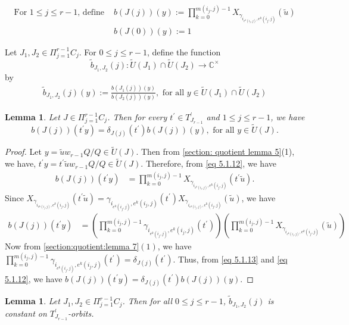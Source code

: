 \documentclass[12pt,reqno]{amsart}
\numberwithin{equation}{section}
\newtheorem{lemma}[theorem]{Lemma}
\theoremstyle{definition}
\begin{document}
	\begin{align}
		\text{For $1\leq j\leq r-1$, define\ }&
		b(J(j))(y):=\prod_{k=0}^{m(i_{j},j)-1}X_{\gamma_{i_{e^{k}(i_{j},j)},e^{k}(i_{j},j)}}(\tilde{u})\label{eq 5.1.12}\\
		&b(J(0))(y):=1\label{eq 5.1.14}
	\end{align}
	
	
	Let $J_{1},J_{2}\in\Pi_{j=1}^{r-1}C_{j}$. For $0\leq j\leq r-1$, define the function
	$$\tilde{b}_{J_{1},J_{2}}(j):\tilde{U}(J_{1})\cap \tilde{U}(J_{2})\longrightarrow\mathbb{C^{\times}}$$ by \begin{align}\label{eq 5.1.15}
		\tilde{b}_{J_{1},J_{2}}(j)(y):=\frac{b(J_{1}(j))(y)}{b(J_{2}(j))(y)},\text{\ for all
			$y\in \tilde{U}(J_{1})\cap \tilde{U}(J_{2})$}
	\end{align}
	\begin{lemma}\label{section:quotient:lemma 8}
		Let $J\in\Pi_{j=1}^{r-1}C_{j}$. Then for every $t^{\prime}\in T^{\prime}_{J_{r-1}}$ and $1\leq j\leq r-1$,  we have $$b(J(j))(t^{\prime}y)=\delta_{J(j)}(t^{\prime})b(J(j))(y),\text{\ for all $y\in \tilde{U}(J)$}.$$
	\end{lemma}
	\begin{proof}
		Let	$y=\tilde{u}w_{r-1}Q/Q\in\tilde{U}(J)$. Then from \cref{section: quotient lemma 5}(1), we have, $t^{\prime}y=t^{\prime}\tilde{u}w_{r-1}Q/Q\in \tilde{U}(J)$. Therefore, from \cref{eq 5.1.12}, we have 
		\begin{align*}
			b(J(j))(t^{\prime}y)&=\prod_{k=0}^{m(i_{j},j)-1}X_{\gamma_{i_{e^{k}(i_{j},j)},e^{k}(i_{j},j)}}(t^{\prime}\tilde{u}).
		\end{align*}
		Since $X_{\gamma_{i_{e^{k}(i_{j},j)},e^{k}(i_{j},j)}}(t^{\prime}\tilde{u})=\gamma_{i_{e^{k}(i_{j},j)},e^{k}(i_{j},j)}(t^{\prime})X_{\gamma_{i_{e^{k}(i_{j},j)},e^{k}(i_{j},j)}}(\tilde{u})$, we have 
		\begin{align}\label{eq 5.1.13}
			b(J(j))(t^{\prime}y)&=(\prod_{k=0}^{m(i_{j},j)-1}\gamma_{i_{e^{k}(i_{j},j)},e^{k}(i_{j},j)}(t^{\prime}))(\prod_{k=0}^{m(i_{j},j)-1}X_{\gamma_{i_{e^{k}(i_{j},j)},e^{k}(i_{j},j)}}(\tilde{u}))
		\end{align}
		Now from \cref{section:quotient:lemma 7}$(1)$, we have $\prod_{k=0}^{m(i_{j},j)-1}\gamma_{i_{e^{k}(i_{j},j)},e^{k}(i_{j},j)}(t^{\prime})=\delta_{J(j)}(t^{\prime})$. Thus, from \cref{eq 5.1.13} and \cref{eq 5.1.12}, we have 	$b(J(j))(t^{\prime}y)=\delta_{J(j)}(t^{\prime})b(J(j))(y)$.
	\end{proof}
	\begin{lemma}\label{section:quotient:lemma 9}
		Let $J_{1},J_{2}\in\Pi_{j=1}^{r-1}C_{j}$. Then for all $0\leq j\leq r-1$, $\tilde{b}_{J_{1},J_{2}}(j)$ is constant on $T^{\prime}_{J_{r-1}}$-orbits.
	\end{lemma}
\end{document}
